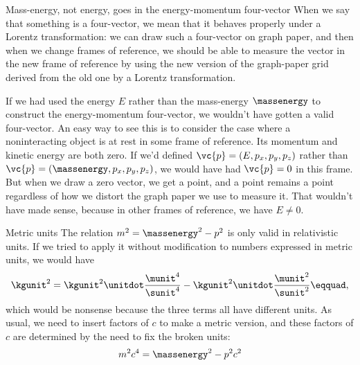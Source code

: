 \begin{eg}{Mass-energy, not energy, goes in the energy-momentum four-vector}
When we say that something is a four-vector, we mean that it behaves properly under a Lorentz transformation:
we can draw such a four-vector on graph paper, and then when we change frames of reference, we should be able
to measure the vector in the new frame of reference by using the new version of the graph-paper grid derived
from the old one by a Lorentz transformation.

If we had used the energy $E$ rather than the mass-energy $\massenergy$ to
construct the energy-momentum four-vector, we wouldn't have gotten a valid four-vector.
An easy way to see this is to consider the case where a noninteracting object is at rest in some frame of reference.
Its momentum and kinetic energy are both zero.
If we'd defined $\vc{p}=(E,p_x,p_y,p_z)$ rather than $\vc{p}=(\massenergy,p_x,p_y,p_z)$, we would have had $\vc{p}=0$ in this
frame. But when we draw a zero vector, we get a point, and a point remains a point regardless of how
we distort the graph paper we use to measure it. That wouldn't have made sense, because in other frames
of reference, we  have $E\ne 0$.
\end{eg}

\begin{eg}{Metric units}
The relation $  m^2 = \massenergy^2 - p^2 $ is only valid in relativistic units. If we tried to apply it without
modification to numbers expressed in metric units, we would have
\begin{equation*}
  \kgunit^2 = \kgunit^2\unitdot\frac{\munit^4}{\sunit^4} - \kgunit^2\unitdot\frac{\munit^2}{\sunit^2}\eqquad,
\end{equation*}
which would be nonsense because the three terms all have different units. As usual, we need to insert factors
of $c$ to make a metric version, and these factors of $c$ are determined by the need to fix the broken units:
\begin{equation*}
  m^2c^4 = \massenergy^2 - p^2c^2
\end{equation*}
\end{eg}

